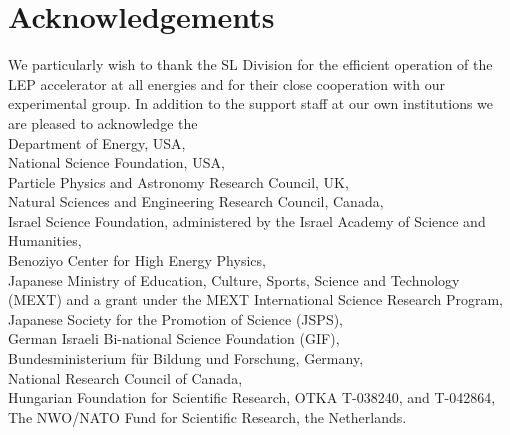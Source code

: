 \documentclass[12pt,a4paper,twoside]{article}
\begin{document}
\newpage
\section*{Acknowledgements}
\par

We particularly wish to thank the SL Division for the efficient operation
of the LEP accelerator at all energies
 and for their close cooperation with
our experimental group.  In addition to the support staff at our own
institutions we are pleased to acknowledge the  \\
Department of Energy, USA, \\
National Science Foundation, USA, \\
Particle Physics and Astronomy Research Council, UK, \\
Natural Sciences and Engineering Research Council, Canada, \\
Israel Science Foundation, administered by the Israel
Academy of Science and Humanities, \\
Benoziyo Center for High Energy Physics,\\
Japanese Ministry of Education, Culture, Sports, Science and
Technology (MEXT) and a grant under the MEXT International
Science Research Program,\\
Japanese Society for the Promotion of Science (JSPS),\\
German Israeli Bi-national Science Foundation (GIF), \\
Bundesministerium f\"ur Bildung und Forschung, Germany, \\
National Research Council of Canada, \\
Hungarian Foundation for Scientific Research, OTKA T-038240,
and T-042864,\\
The NWO/NATO Fund for Scientific Research, the Netherlands.\\

%
\newpage
\end{document}
